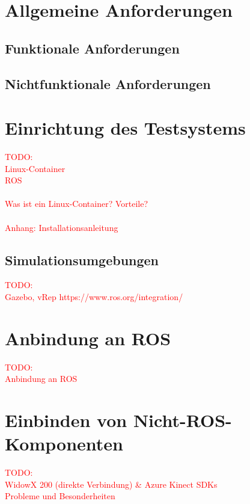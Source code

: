 
\section{Allgemeine Anforderungen}

\subsection{Funktionale Anforderungen}


\subsection{Nichtfunktionale Anforderungen}


\section{Einrichtung des Testsystems}
\textcolor{red}{TODO:\\
Linux-Container\\
ROS\\
\\
Was ist ein Linux-Container? Vorteile?\\
\\
Anhang: Installationsanleitung
}


\subsection{Simulationsumgebungen}
\textcolor{red}{TODO:\\
Gazebo, vRep %
https://www.ros.org/integration/
}


\section{Anbindung an ROS}
\textcolor{red}{TODO:\\
Anbindung an ROS
}


\section{Einbinden von Nicht-ROS-Komponenten}
\textcolor{red}{TODO:\\
WidowX 200 (direkte Verbindung) \& Azure Kinect SDKs\\
Probleme und Besonderheiten
}


